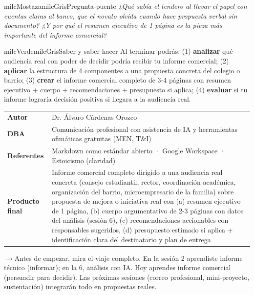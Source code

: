 \documentclass[11pt,letterpaper]{article}
\newcommand{\puente}[1]{%
  \begin{puentebox}%
    \textcolor{milcGradeDark}{$\rightarrow$}\hspace{2mm}#1%
  \end{puentebox}%
}
\begin{document}
\begin{softbox}{milcMostaza}{milcGris}{Pregunta-puente}
\textit{¿Qué sabía el tendero al llevar el papel con cuentas claras al banco, que el novato olvida cuando hace propuesta verbal sin documento? ¿Y por qué el resumen ejecutivo de 1 página es la pieza más importante del informe comercial?}
\end{softbox}

\begin{softbox}{milcVerde}{milcGris}{Saber y saber hacer}
Al terminar podrás: (1) \textbf{analizar} qué audiencia real con poder de decidir podría recibir tu informe comercial; (2) \textbf{aplicar} la estructura de 4 componentes a una propuesta concreta del colegio o barrio; (3) \textbf{crear} el informe comercial completo de 3-4 páginas con resumen ejecutivo + cuerpo + recomendaciones + presupuesto si aplica; (4) \textbf{evaluar} si tu informe lograría decisión positiva si llegara a la audiencia real.
\end{softbox}



\small
\begin{tabularx}{\textwidth}{>{\bfseries}p{3.0cm}Y}
Autor & Dr. Álvaro Cárdenas Orozco\\
DBA & Comunicación profesional con asistencia de IA y herramientas ofimáticas gratuitas (MEN, T\&I)\\
Referentes & Markdown como estándar abierto · Google Workspace · Estoicismo (claridad)\\
Producto final & Informe comercial completo dirigido a una audiencia real concreta (consejo estudiantil, rector, coordinación académica, organización del barrio, microempresario de la familia) sobre propuesta de mejora o iniciativa real con (a) resumen ejecutivo de 1 página, (b) cuerpo argumentativo de 2-3 páginas con datos del análisis (sesión 6), (c) recomendaciones accionables con responsables sugeridos, (d) presupuesto estimado si aplica + identificación clara del destinatario y plan de entrega\\
\end{tabularx}
\normalsize

\puente{Antes de empezar, mira el viaje completo. En la sesión 2 aprendiste informe técnico (informar); en la 6, análisis con IA. Hoy aprendes informe comercial (persuadir para decidir). Las próximas sesiones (correo profesional, mini-proyecto, sustentación) integrarán todo en propuestas reales.}
\end{document}
